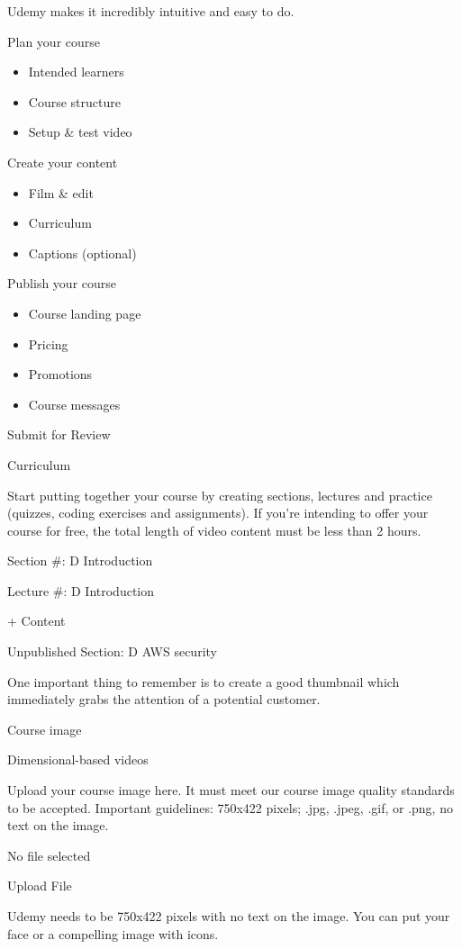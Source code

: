 \documentclass[11pt]{article}
\begin{document}
Udemy makes it incredibly intuitive and easy to do.

Plan your course
\begin{itemize}
\item Intended learners
\item Course structure
\item Setup \& test video
\end{itemize}

Create your content
\begin{itemize}
\item Film \& edit
\item Curriculum
\item Captions (optional)
\end{itemize}

Publish your course
\begin{itemize}
\item Course landing page
\item Pricing
\item Promotions
\item Course messages
\end{itemize}

Submit for Review

Curriculum

Start putting together your course by creating sections, lectures and practice (quizzes, coding exercises and assignments).
If you're intending to offer your course for free, the total length of video content must be less than 2 hours.

Section \#: D Introduction

Lecture \#: D Introduction

+ Content

Unpublished Section: D AWS security

One important thing to remember is to create a good thumbnail which immediately grabs the attention of a potential customer.

Course image

Dimensional-based videos

Upload your course image here. It must meet our course image quality standards to be accepted. Important guidelines:
750x422 pixels; .jpg, .jpeg, .gif, or .png, no text on the image.

No file selected

Upload File

Udemy needs to be 750x422 pixels with no text on the image. You can put your face or a compelling image with icons.
\end{document}
